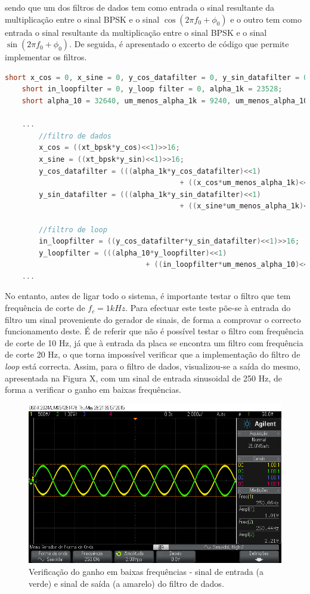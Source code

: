 \documentclass[11pt]{article}
\numberwithin{equation}{section}
\begin{document}
\vspace{1mm}
sendo que um dos filtros de dados tem como entrada o sinal resultante da multiplicação entre o sinal BPSK e o sinal $\cos(2\pi f_0 + \phi_0)$ e o outro tem como entrada o sinal resultante da multiplicação entre o sinal BPSK e o sinal $\sin(2\pi f_0 + \phi_0)$. De seguida, é apresentado o excerto de código que permite implementar os filtros. 

\begin{lstlisting}[language=C]
	short x_cos = 0, x_sine = 0, y_cos_datafilter = 0, y_sin_datafilter = 0;  
	short in_loopfilter = 0, y_loop filter = 0, alpha_1k = 23528; 
	short alpha_10 = 32640, um_menos_alpha_1k = 9240, um_menos_alpha_10 = 127;

	...
		//filtro de dados
		x_cos = ((xt_bpsk*y_cos)<<1)>>16;
		x_sine = ((xt_bpsk*y_sin)<<1)>>16;
		y_cos_datafilter = (((alpha_1k*y_cos_datafilter)<<1)
										 + ((x_cos*um_menos_alpha_1k)<<1))>>16;
		y_sin_datafilter = (((alpha_1k*y_sin_datafilter)<<1)
										 + ((x_sine*um_menos_alpha_1k)<<1))>>16;
	
		//filtro de loop
		in_loopfilter = ((y_cos_datafilter*y_sin_datafilter)<<1)>>16;
		y_loopfilter = (((alpha_10*y_loopfilter)<<1) 
								 + ((in_loopfilter*um_menos_alpha_10)<<1))>>16;
	...
\end{lstlisting}

No entanto, antes de ligar todo o sistema, é importante testar o filtro que tem frequência de corte de $f_c = 1 kHz$. Para efectuar este teste põe-se à entrada do filtro um sinal proveniente do gerador de sinais, de forma a comprovar o correcto funcionamento deste. É de referir que não é possível testar o filtro com frequência de corte de 10 Hz, já que à entrada da placa se encontra um filtro com frequência de corte 20 Hz, o que torna impossível verificar que a implementação do filtro de \textit{loop} está correcta. Assim, para o filtro de dados, visualizou-se a saída do mesmo, apresentada na Figura X, com um sinal de entrada sinusoidal de 250 Hz, de forma a verificar o ganho em baixas frequências.

\begin{figure}[H]
	\centering
	\includegraphics[keepaspectratio=true, scale=0.37]{exps/filtro_1k_baixafreq}
	\caption{Verificação do ganho em baixas frequências - sinal de entrada (a verde) e sinal de saída (a amarelo) do filtro de dados.}
	\vspace{-0.8em}
\end{figure} 
\end{document}
